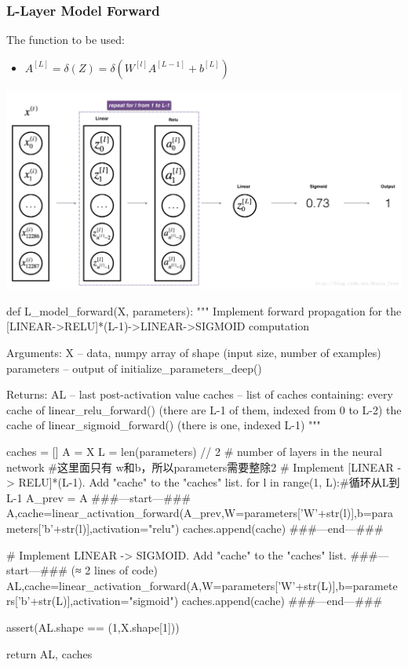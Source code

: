 \documentclass[12pt,a4paper]{article}
\begin{document}
		\subsubsection{L-Layer Model Forward}
		The function to be used:
			\begin{itemize}
				\item $A^{[L]}=\delta(Z)=\delta(W^{[l]}A^{[L-1]}+b^{[L]})$
			\end{itemize}
			\includegraphics[scale=0.6]{image_3.png}
			\newpage
			\begin{python}
				def L_model_forward(X, parameters):
				"""
				Implement forward propagation for the [LINEAR->RELU]*(L-1)->LINEAR->SIGMOID computation

				Arguments:
				X -- data, numpy array of shape (input size, number of examples)
				parameters -- output of initialize_parameters_deep()
				
				Returns:
				AL -- last post-activation value
				caches -- list of caches containing:
				every cache of linear_relu_forward() (there are L-1 of them, indexed from 0 to L-2)
				the cache of linear_sigmoid_forward() (there is one, indexed L-1)
				"""
				
				caches = []
				A = X
				L = len(parameters) // 2 # number of layers in the neural network
				#这里面只有 w和b，所以parameters需要整除2
				# Implement [LINEAR -> RELU]*(L-1). Add "cache" to the "caches" list.
				for l in range(1, L):#循环从L到L-1
				A_prev = A
				###---start---###
				A,cache=linear_activation_forward(A_prev,W=parameters['W'+str(l)],b=parameters['b'+str(l)],activation="relu")
				caches.append(cache)
				###---end---###
				
				# Implement LINEAR -> SIGMOID. Add "cache" to the "caches" list.
				###---start---### (≈ 2 lines of code)
				AL,cache=linear_activation_forward(A,W=parameters['W'+str(L)],b=parameters['b'+str(L)],activation="sigmoid")
				caches.append(cache)
				###---end---###
				
				assert(AL.shape == (1,X.shape[1]))
				
				return AL, caches
			\end{python}
		\newpage
\end{document}
